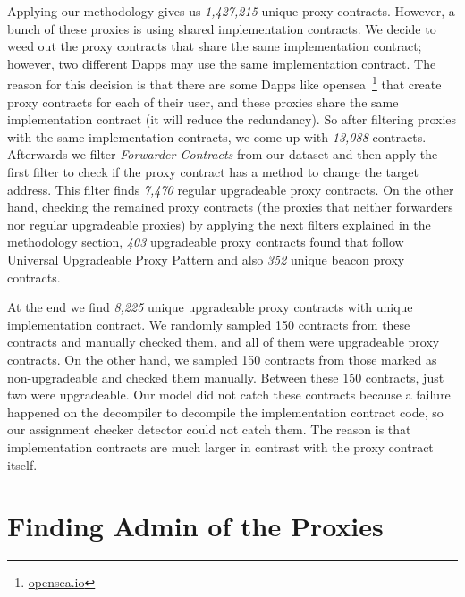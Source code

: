 
Applying our methodology gives us \textit{1,427,215} unique proxy contracts. However, a bunch of these proxies is using shared implementation contracts. We decide to weed out the proxy contracts that share the same implementation contract; however, two different Dapps may use the same implementation contract. The reason for this decision is that there are some Dapps like opensea~\footnote{\url{opensea.io}} that create proxy contracts for each of their user, and these proxies share the same implementation contract (it will reduce the redundancy). So after filtering proxies with the same implementation contracts, we come up with \textit{13,088} contracts.
Afterwards we filter \textit{Forwarder Contracts} from our dataset and then apply the first filter to check if the proxy contract has a method to change the target address. This filter finds \textit{7,470} regular upgradeable proxy contracts.
On the other hand, checking the remained proxy contracts (the proxies that neither forwarders nor regular upgradeable proxies) by applying the next filters explained in the methodology section, \textit{403} upgradeable proxy contracts found that follow Universal Upgradeable Proxy Pattern and also \textit{352} unique beacon proxy contracts.

At the end we find \textit{8,225} unique upgradeable proxy contracts with unique implementation contract. We randomly sampled 150 contracts from these contracts and manually checked them, and all of them were upgradeable proxy contracts. On the other hand, we sampled 150 contracts from those marked as non-upgradeable and checked them manually. Between these 150 contracts, just two were upgradeable. Our model did not catch these contracts because a failure happened on the decompiler to decompile the implementation contract code, so our assignment checker detector could not catch them. The reason is that implementation contracts are much larger in contrast with the proxy contract itself.


\section{Finding Admin of the Proxies}

